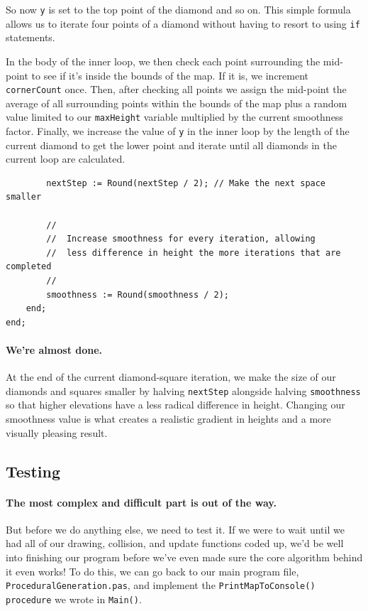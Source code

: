 \documentclass{article}
\begin{document}
So now \texttt{y} is set to the top point of the diamond and so on. This simple formula allows us to iterate four points of a diamond without having to resort to using \texttt{if} statements.

In the body of the inner loop, we then check each point surrounding the mid-point to see if it's inside the bounds of the map. If it is, we increment \texttt{cornerCount} once. Then, after checking all points we assign the mid-point the average of all surrounding points within the bounds of the map plus a random value limited to our \texttt{maxHeight} variable multiplied by the current smoothness factor. Finally, we increase the value of \texttt{y} in the inner loop by the length of the current diamond to get the lower point and iterate until all diamonds in the current loop are calculated.

\begin{verbatim}
		nextStep := Round(nextStep / 2); // Make the next space smaller

		//
		//	Increase smoothness for every iteration, allowing
		//	less difference in height the more iterations that are completed
		//
		smoothness := Round(smoothness / 2);
	end;
end;
\end{verbatim}

\paragraph{We're almost done.} At the end of the current diamond-square iteration, we make the size of our diamonds and squares smaller by halving \texttt{nextStep} alongside halving \texttt{smoothness} so that higher elevations have a less radical difference in height. Changing our smoothness value is what creates a realistic gradient in heights and a more visually pleasing result.

\subsection{Testing}

\paragraph{The most complex and difficult part is out of the way.} But before we do anything else, we need to test it. If we were to wait until we had all of our drawing, collision, and update functions coded up, we'd be well into finishing our program before we've even made sure the core algorithm behind it even works! To do this, we can go back to our main program file, \texttt{ProceduralGeneration.pas}, and implement the \texttt{PrintMapToConsole() procedure} we wrote in \texttt{Main()}. 


\printbibliography
	
\end{document}

